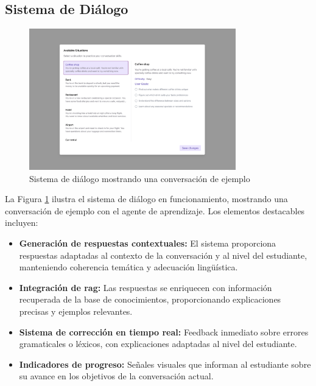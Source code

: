 \subsection{Sistema de Diálogo}
\label{subsec:sistema-dialogo}

\begin{figure}[H]
    \centering
    \includegraphics[width=0.8\textwidth]{figuras/screenshots/chat-complete.png}
    \caption{Sistema de diálogo mostrando una conversación de ejemplo}
    \label{fig:dialog-system}
\end{figure}

La Figura \ref{fig:dialog-system} ilustra el sistema de diálogo en funcionamiento, mostrando una conversación de ejemplo con el agente de aprendizaje. Los elementos destacables incluyen:

\begin{itemize}
    \item \textbf{Generación de respuestas contextuales:} El sistema proporciona respuestas adaptadas al contexto de la conversación y al nivel del estudiante, manteniendo coherencia temática y adecuación lingüística.
    
    \item \textbf{Integración de \gls{rag}:} Las respuestas se enriquecen con información recuperada de la base de conocimientos, proporcionando explicaciones precisas y ejemplos relevantes.
    
    \item \textbf{Sistema de corrección en tiempo real:} Feedback inmediato sobre errores gramaticales o léxicos, con explicaciones adaptadas al nivel del estudiante.
    
    \item \textbf{Indicadores de progreso:} Señales visuales que informan al estudiante sobre su avance en los objetivos de la conversación actual.
\end{itemize}

